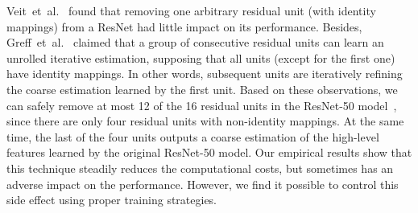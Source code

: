 \documentclass[10pt,twocolumn,letterpaper]{article}
\begin{document}
Veit~et~al.~\cite{UnraveledResNet.2016.Veit} found that removing one arbitrary residual unit (with identity mappings) from a ResNet had little impact on its performance.
Besides, Greff~et~al.~\cite{UnrolledIterativeEstimation.ICLR.2017.Greff} claimed that a group of consecutive residual units can learn an unrolled iterative estimation,
supposing that all units (except for the first one) have identity mappings.
In other words, subsequent units are iteratively refining the coarse estimation learned by the first unit.
Based on these observations,
we can safely remove at most 12 of the 16 residual units in the ResNet-50 model~\cite{ResNet.CVPR.2016.He},
since there are only four residual units with non-identity mappings.
At the same time, the last of the four units outputs a coarse estimation of the high-level features learned by the original ResNet-50 model.
Our empirical results show that this technique steadily reduces the computational costs,
but sometimes has an adverse impact on the performance.
However, we find it possible to control this side effect using proper training strategies.


%


%
%
%
%
%
%
%
\begin{table*}[th]
\setlength{\tabcolsep}{5pt}
\begin{center}
\end{center}
\vspace{-2.0mm}
\caption{Results (\%) of networks with different configurations of kernel dilations and up-sampling layers on the Cityscapes~\cite{Cityscapes.CVPR.2016.Cordts} \textit{val} set.
All of the three models are SharpMask-like.
And structure of the third one is given in Fig.~\ref{fig:baseline},
which is chosen in this work for efficiency. 
}
\label{tbl:basic}
\vspace{-4.0mm}
\end{table*}
\end{document}
